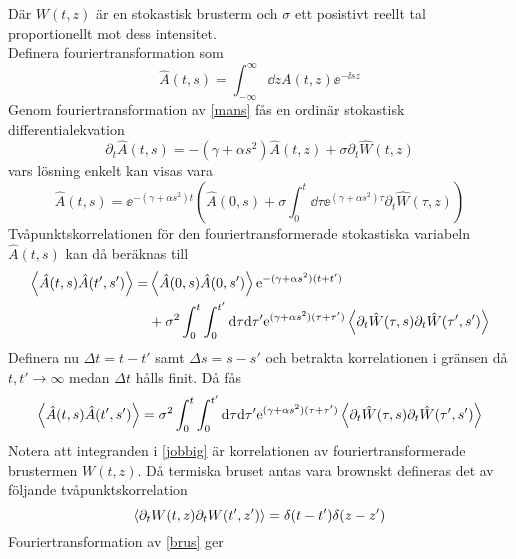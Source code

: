 Där $W(t,z)$ är en stokastisk brusterm och $\sigma$ ett posistivt reellt tal proportionellt mot dess intensitet.\\
Definera fouriertransformation som 
\begin{equation}
    \hat{A}(t,s)=\int_{-\infty}^{\infty}\dd{z} A(t,z)\ee^{-\ii sz}
\end{equation}
Genom fouriertransformation av \eqref{mans} fås en ordinär stokastisk differentialekvation
\begin{equation}
        \partial_{t}\hat{A}(t,s)=-\left(\gamma+\alpha s^2\right)\hat{A}(t,z)+\sigma \partial_{t}\hat{W}(t,z)
\end{equation}
vars lösning enkelt kan visas vara
\begin{equation}
        \hat{A}(t,s)=\ee^{-(\gamma+\alpha s^2)t}\left(\hat{A}(0,s)+\sigma\int_{0}^{t}\dd\tau \ee^{(\gamma+\alpha s^2)\tau}\partial_{t}\hat{W}(\tau,z)\right)
\end{equation}
Tvåpunktskorrelationen för den fouriertransformerade stokastiska variabeln $\hat{A}(t,s)$ kan då beräknas till
\begin{equation}
\begin{aligned}
    \ev{\hat{A}(t,s)\hat{A}(t',s')} =& \ev{\hat{A}(0,s)\hat{A}(0,s')} \ee^{-(\gamma+\alpha s^2)(t+t')}\\ 
    &+ \sigma^2 \int_{0}^{t}\int_{0}^{t'}\dd\tau\dd\tau' \ee^{(\gamma+\alpha s^2)(\tau+\tau')} \ev{\partial_{t}\hat{W}(\tau,s)\partial_{t}\hat{W}(\tau',s')}
\end{aligned}
\end{equation}
Definera nu $\Delta t=t-t'$ samt $\Delta s=s-s'$ och betrakta korrelationen i gränsen då $t,t'\rightarrow\infty$ medan $\Delta t$ hålls finit. Då fås
\begin{equation}\label{jobbig}
     \ev{\hat{A}(t,s)\hat{A}(t',s')}=\sigma^2\int_{0}^{t}\int_{0}^{t'}\dd\tau\dd\tau'\ee^{(\gamma+\alpha s^2)(\tau+\tau')}\ev{\partial_{t}\hat{W}(\tau,s)\partial_{t}\hat{W}(\tau',s')}
\end{equation}
Notera att integranden i \eqref{jobbig} är korrelationen av fouriertransformerade brustermen $W(t,z)$. Då termiska bruset antas vara brownskt defineras det av följande tvåpunktskorrelation
\begin{equation}\label{brus}
    \ev{\partial_{t}W(t,z)\partial_{t}W(t',z')}=\delta(t- t')\delta(z-z')
\end{equation}
Fouriertransformation av \eqref{brus} ger 
